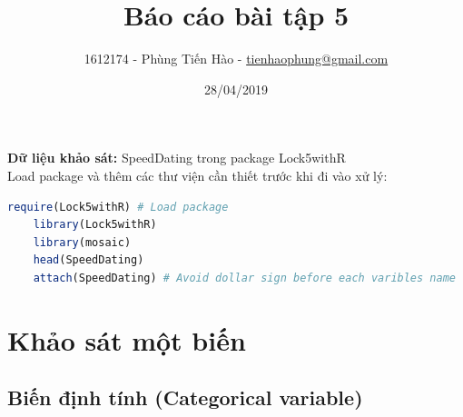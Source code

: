 \documentclass[a4paper,12pt]{article}
\title{Báo cáo bài tập 5}
\author{1612174 - Phùng Tiến Hào - \href{mailto:tienhaophung@gmail.com}{tienhaophung@gmail.com}}
\date{28/04/2019}
\begin{document}
	\maketitle
	\newpage
	
	\doublespacing
	\tableofcontents
	\singlespace
	
	\newpage
	
	\textbf{Dữ liệu khảo sát:} SpeedDating trong package Lock5withR\\
	
	Load package và thêm các thư viện cần thiết trước khi đi vào xử lý:
	\begin{lstlisting}[language=R]
	require(Lock5withR) # Load package
	library(Lock5withR)
	library(mosaic)
	head(SpeedDating)
	attach(SpeedDating) # Avoid dollar sign before each varibles name
	\end{lstlisting}
	\section{Khảo sát một biến}
	\subsection{Biến định tính (Categorical variable)}
\end{document}
